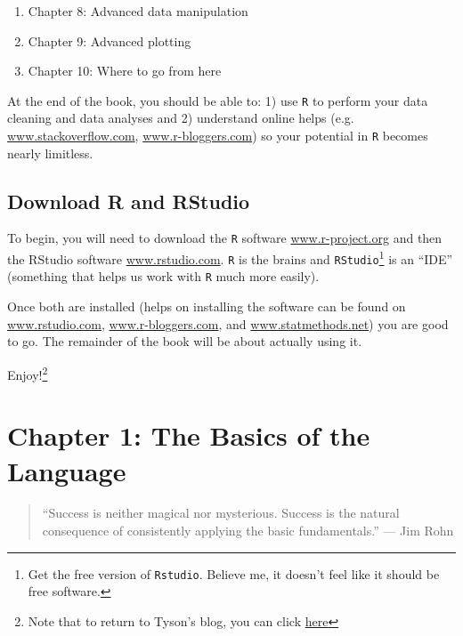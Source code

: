 \documentclass[]{tufte-book}
\providecommand{\tightlist}{%
  \setlength{\itemsep}{0pt}\setlength{\parskip}{0pt}}
\theoremstyle{definition}
\theoremstyle{definition}
\theoremstyle{remark}
\begin{document}
\begin{enumerate}
\def\labelenumi{\arabic{enumi}.}
\setcounter{enumi}{7}
\tightlist
\item
  Chapter 8: Advanced data manipulation
\item
  Chapter 9: Advanced plotting
\item
  Chapter 10: Where to go from here
\end{enumerate}

At the end of the book, you should be able to: 1) use \texttt{R} to
perform your data cleaning and data analyses and 2) understand online
helps (e.g. \url{www.stackoverflow.com}, \url{www.r-bloggers.com}) so
your potential in \texttt{R} becomes nearly limitless.

\section*{Download R and RStudio}\label{download-r-and-rstudio}

To begin, you will need to download the \texttt{R} software
\href{https://www.r-project.org/}{www.r-project.org} and then the
RStudio software \href{https://www.rstudio.com/}{www.rstudio.com}.
\texttt{R} is the brains and \texttt{RStudio}\footnote{Get the free
  version of \texttt{Rstudio}. Believe me, it doesn't feel like it
  should be free software.} is an ``IDE'' (something that helps us work
with \texttt{R} much more easily).

Once both are installed (helps on installing the software can be found
on \href{https://www.rstudio.com/}{www.rstudio.com},
\url{www.r-bloggers.com}, and \url{www.statmethods.net}) you are good to
go. The remainder of the book will be about actually using it.

Enjoy!\footnote{Note that to return to Tyson's blog, you can click
  \href{https://tysonstanley.github.io}{here}}

\chapter*{Chapter 1: The Basics of the
Language}\label{chapter-1-the-basics-of-the-language}

\begin{quote}
``Success is neither magical nor mysterious. Success is the natural
consequence of consistently applying the basic fundamentals.'' --- Jim
Rohn
\end{quote}
\end{document}
